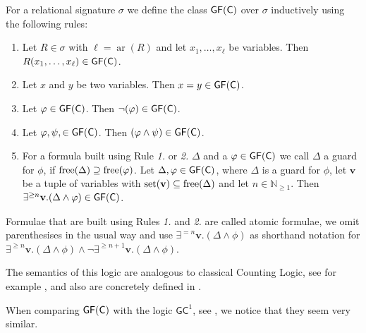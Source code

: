 \begin{definition}
	\label{def:GFC}
	For a relational signature $\sigma$ we define the class $\mathsf{GF}(\mathsf{C})$ over $\sigma$ inductively using the following rules:
	\begin{enumerate}
		\item Let $R\in\sigma$ with $\ell=\operatorname{ar}(R)$ and let $x_1,\dots,x_\ell$ be variables. Then $R(x_1,\dots,x_\ell)\in \mathsf{GF}(\mathsf{C})$.
		\item Let $x$ and $y$ be two variables. 
		Then $x=y\in\mathsf{GF}(\mathsf{C})$.
		\item Let $\varphi\in\mathsf{GF}(\mathsf{C})$.
		Then $\neg(\varphi)\in\mathsf{GF}(\mathsf{C})$.
		\item Let $\varphi,\psi,\in\mathsf{GF}(\mathsf{C})$. 
		Then $(\varphi\land\psi)\in\mathsf{GF}(\mathsf{C})$.
		\item For a formula built using Rule \emph{1.} or \emph{2.} $\Delta$ and a $\varphi\in\mathsf{GF}(\mathsf{C})$ we call $\Delta$ a guard for $\phi$, if $\operatorname{free}(\Delta)\supseteq\operatorname{free}(\varphi)$.
		Let $\Delta,\varphi\in \mathsf{GF}(\mathsf{C})$, where $\Delta$ is a guard for $\phi$, let $\mathbf v$ be a tuple of variables with $\operatorname{set}(\mathbf v)\subseteq \operatorname{free}(\Delta)$ and let $n\in \mathbb N_{\geq 1}$. 
		Then $\exists^{\geq n}\mathbf v . (\Delta \land \varphi)\in \mathsf{GF}(\mathsf{C})$.
	\end{enumerate}
	Formulae that are built using Rules \emph{1.} and \emph{2.} are called atomic formulae, we omit parenthesises in the usual way and use $\exists^{=n}\mathbf v.(\Delta\land\phi)$ as shorthand notation for $\exists^{\geq n}\mathbf v.(\Delta\land\phi)\land \neg\exists^{\geq n+1}\mathbf v.(\Delta\land\phi)$.
	
	The semantics of this logic are analogous to classical Counting Logic, see for example \cite{cai1992OptimalLower}, and also are concretely defined in \cite{scheidt2025ColorRefinement}.
\end{definition}
When comparing $\mathsf{GF}(\mathsf{C})$ with the logic $\mathsf{GC}^1$, see \cite{scheidt2023CountingHomomorphisms}, we notice that they seem very similar.

